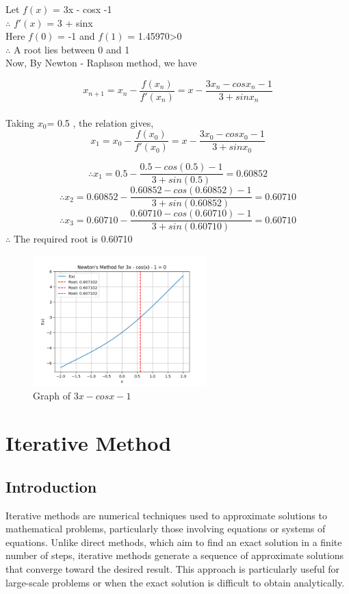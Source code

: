 \documentclass[12pt,a4paper]{article}
\begin{document}
		
		Let \(f(x)\) = 3x - cosx -1 \\
		$\therefore$ \(f'(x)\) = 3 + sinx \\
		Here \(f(0)\) = -1 and \(f(1)\) = 1.45970>0 \\
		$\therefore$ A root lies between 0 and 1 \\
		Now, By Newton - Raphson method, we have 
		
			
		\[
		x_{n+1} = x_n - \frac{f(x_n)}{f'(x_n)} = x - \frac{3x_n - cosx_n - 1}{3 + sin x_n}
		\]
		\\
		Taking $x_{0}$= 0.5 , the relation gives, \\
		\[
		x_{1} = x_0 - \frac{f(x_0)}{f'(x_0)} = x - \frac{3x_0 - cosx_0 - 1}{3 + sin x_0}
		\]
		
		\[
		\therefore x_{1} = 0.5 - \frac{0.5 - cos(0.5) - 1}{3 + sin (0.5)} = 0.60852
		\]
		\[
		\therefore x_{2} = 0.60852 - \frac{0.60852 - cos(0.60852) - 1}{3 + sin (0.60852)} = 0.60710
		\]
				\[
		\therefore x_{3} = 0.60710 - \frac{0.60710 - cos(0.60710) - 1}{3 + sin (0.60710)} = 0.60710
		\]
		$\therefore$ The required root is 0.60710
	
	\begin{figure}[h]
		\centering
		\includegraphics[width=0.6\textwidth]{Nr_fig_2.png} %
		\caption{Graph of $3x - cosx -1$}
		\label{x}
	\end{figure}
	

	\newpage
	\section{\centering Iterative Method}

	\subsection{Introduction} \fontsize{18pt}{18pt}\selectfont
	Iterative methods are numerical techniques used to approximate solutions to mathematical problems, particularly those involving equations or systems of equations. Unlike direct methods, which aim to find an exact solution in a finite number of steps, iterative methods generate a sequence of approximate solutions that converge toward the desired result. This approach is particularly useful for large-scale problems or when the exact solution is difficult to obtain analytically.\\
	
\end{document}
